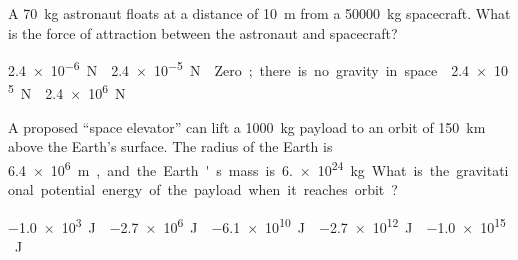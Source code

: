 \documentclass{../../oss-apphys-exam}
\begin{document}
\genheader



\raggedcolumns
\begin{multicols*}{2}
  \begin{questions}
    \question A \SI{70}{\kilo\gram} astronaut floats at a distance of
    \SI{10}{\metre} from a \SI{50000}{\kilo\gram} spacecraft. What is the force
    of attraction between the astronaut and spacecraft?
    \begin{choices}
      \choice\SI{2.4e-6}\newton
      \choice\SI{2.4e-5}\newton
      \choice Zero; there is no gravity in space.
      \choice\SI{2.4e5}\newton
      \choice\SI{2.4e6}\newton
    \end{choices}
    \vspace{.5in}
    
    
    \question A proposed ``space elevator'' can lift a \SI{1000}{\kilo\gram}
    payload to an orbit of \SI{150}{\kilo\metre} above the Earth's surface. The
    radius of the Earth is \SI{6.4e6}\metre, and the Earth's mass is
    \SI{6.e24}{\kilo\gram}. What is the gravitational potential energy of the
    payload when it reaches orbit?
    \begin{choices}
      \choice\SI{-1.0e3}\joule
      \choice\SI{-2.7e6}\joule
      \choice\SI{-6.1e10}\joule
      \choice\SI{-2.7e12}\joule
      \choice\SI{-1.0e15}\joule
    \end{choices}
    
%    


\end{questions}
\end{multicols*}
\end{document}
